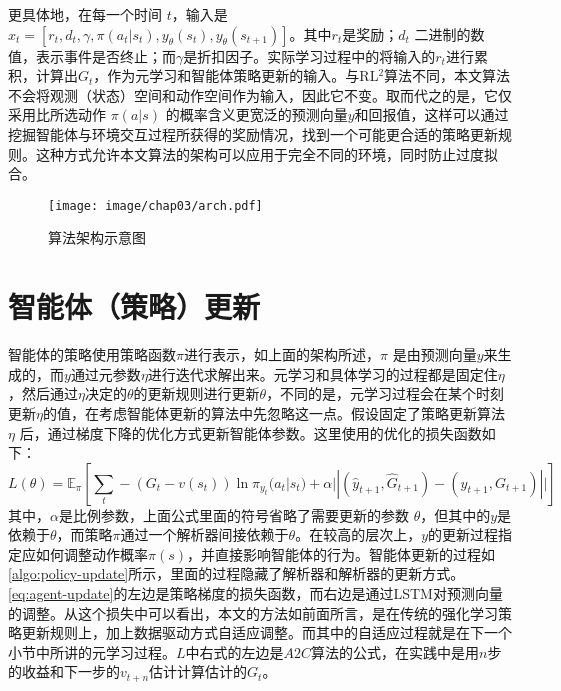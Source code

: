 更具体地，在每一个时间 $t$，输入是 $x_t = [r_t, d_t, \gamma, \pi(a_t | s_t), y_{\theta}(s_t), y_{\theta}(s_{t+1})]$。其中$r_t$是奖励；$d_t$ 二进制的数值，表示事件是否终止；而$\gamma$是折扣因子。实际学习过程中的将输入的$r_t$进行累积，计算出$G_t$，作为元学习和智能体策略更新的输入。与RL$^2$\cite{duanRLFastReinforcement2016}算法不同，本文算法不会将观测（状态）空间和动作空间作为输入，因此它不变。取而代之的是，它仅采用比所选动作 $\pi(a|s)$ 的概率含义更宽泛的预测向量$y$和回报值，这样可以通过挖掘智能体与环境交互过程所获得的奖励情况，找到一个可能更合适的策略更新规则。这种方式允许本文算法的架构可以应用于完全不同的环境，同时防止过度拟合。

\begin{figure}[h!]
    \centering
    \texttt{[image: image/chap03/arch.pdf]}
    \caption{算法架构示意图}
    \label{fig:arch}
\end{figure}



\section{智能体（策略）更新}
智能体的策略使用策略函数$\pi$进行表示，如上面的架构所述，$\pi$ 是由预测向量$y$来生成的，而$y$通过元参数$\eta$进行迭代求解出来。元学习和具体学习的过程都是固定住$\eta$，然后通过$\eta$决定的$\theta$的更新规则进行更新$\theta$，不同的是，元学习过程会在某个时刻更新$\eta$的值，在考虑智能体更新的算法中先忽略这一点。假设固定了策略更新算法 $\eta$ 后，通过梯度下降的优化方式更新智能体参数。这里使用的优化的损失函数如下：
{
\small
\begin{equation}
    L(\theta) = \mathbb{E}_{\pi} \left[\sum_t -(G_t - v(s_t) ) \ln \pi_{y_t} (a_t|s_t) + \alpha || (\hat{y}_{t+1}, \hat{G}_{t+1}) - (y_{t+1}, G_{t+1})|| \right]
    \label{eq:agent-update}
\end{equation}
}
其中，$\alpha$是比例参数，上面公式里面的符号省略了需要更新的参数 $\theta$，但其中的$y$是依赖于$\theta$，而策略$\pi$通过一个解析器间接依赖于$\theta$。在较高的层次上，$y$的更新过程指定应如何调整动作概率$\pi(s)$，并直接影响智能体的行为。智能体更新的过程如 \autoref{algo:policy-update}所示，里面的过程隐藏了解析器和解析器的更新方式。\autoref{eq:agent-update}的左边是策略梯度的损失函数，而右边是通过LSTM对预测向量的调整。从这个损失中可以看出，本文的方法如前面所言，是在传统的强化学习策略更新规则上，加上数据驱动方式自适应调整。而其中的自适应过程就是在下一个小节中所讲的元学习过程。$L$中右式的左边是$A2C$算法的公式，在实践中是用$n$步的收益和下一步的$v_{t+n}$估计计算估计的$G_t$。

